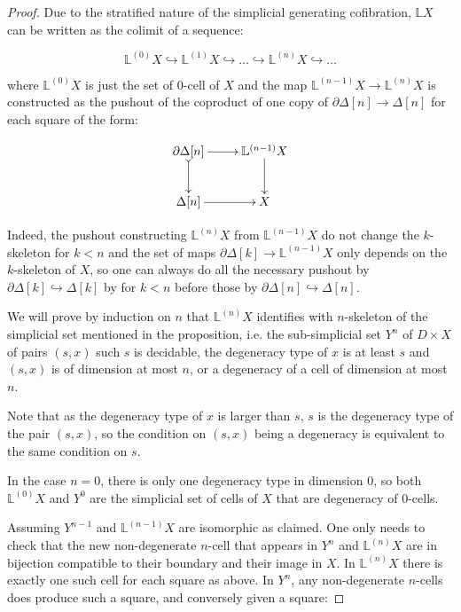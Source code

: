 \documentclass[reqno,10pt,a4paper,oneside,draft]{amsart}
\begin{document}
\begin{proof}

Due to the stratified nature of the simplicial generating cofibration, $\mathbb{L} X$ can be written as the colimit of a sequence:


 \[ \mathbb{L}^{(0)} X \hookrightarrow \mathbb{L}^{(1)} X \hookrightarrow \dots \hookrightarrow \mathbb{L}^{(n)} X \hookrightarrow \dots \]

where $\mathbb{L}^{(0)} X$ is just the set of $0$-cell of $X$ and the map $\mathbb{L}^{(n-1)} X \rightarrow \mathbb{L}^{(n)} X$ is constructed as the pushout of the coproduct of one copy of $\partial \Delta[n] \rightarrow \Delta[n]$ for each square of the form:

\[ \xymatrix{\partial \Delta[n]  \ar[r] \ar@{>->}[d] & \mathbb{L}^{(n-1)} X \ar[d] \\ \Delta[n]  \ar[r] & X} \]

Indeed, the pushout constructing $\mathbb{L}^{(n)} X$ from $\mathbb{L}^{(n-1)} X$ do not change the $k$-skeleton for $k <n$ and the set of maps $\partial \Delta[k] \rightarrow \mathbb{L}^{(n-1)} X$ only depends on the $k$-skeleton of $X$, so one can always do all the necessary pushout by $\partial \Delta[k] \hookrightarrow \Delta[k]$ by for $k<n$ before those by $\partial \Delta[n] \hookrightarrow \Delta[n]$.


We will prove by induction on $n$ that $\mathbb{L}^{(n)} X$ identifies with $n$-skeleton of the simplicial set mentioned in the proposition, i.e. the sub-simplicial set $Y^n$ of $D \times X$ of pairs $(s,x)$ such $s$ is decidable,  the degeneracy type of $x$ is at least $s$ and $(s,x)$ is of dimension at most $n$, or a degeneracy of a cell of dimension at most $n$.

Note that as the degeneracy type of $x$ is larger than $s$, $s$ is the degeneracy type of the pair $(s,x)$, so the condition on $(s,x)$ being a degeneracy is equivalent to the same condition on $s$.

In the case $n=0$, there is only one degeneracy type in dimension $0$, so both $\mathbb{L}^{(0)} X $ and $Y^0$ are the simplicial set of cells of $X$ that are degeneracy of $0$-cells.

Assuming $Y^{n-1}$ and $\mathbb{L}^{(n-1)} X$ are isomorphic as claimed. One only needs to check that the new non-degenerate $n$-cell that appears in $Y^{n}$ and $\mathbb{L}^{(n)} X $ are in bijection compatible to their boundary and their image in $X$.
In $\mathbb{L}^{(n)} X $ there is exactly one such cell for each square as above. In $Y^{n}$, any non-degenerate $n$-cells does produce such a square, and conversely given a square:


\end{proof}
\end{document}
